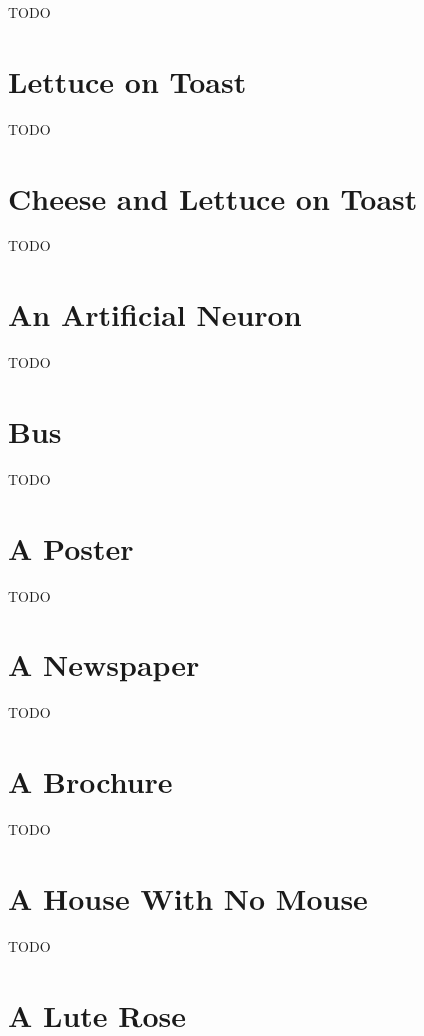 TODO


\section{Lettuce on Toast}\label{sec:toastexample}

TODO


\section{Cheese and Lettuce on Toast}\label{sec:cheeseexample}

TODO


\section{An Artificial Neuron}\label{sec:neuronexample}

TODO


\section{Bus}\label{sec:busexample}

TODO


\section{A Poster}\label{sec:postertutorial}

TODO


\section{A Newspaper}\label{sec:newstutorial}

TODO


\section{A Brochure}\label{sec:brochure}

TODO


\section{A House With No Mouse}\label{sec:accesstutorial}

TODO


\section{A Lute Rose}\label{sec:rosetutorial}

